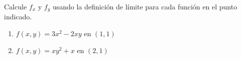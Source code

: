 Calcule $f_x$ y $f_y$ usando la definición de límite para cada función en el punto indicado.
\begin{enumerate}
    \item $f(x, y) = 3x^2 - 2xy$ en $(1, 1)$
    \item $f(x, y) = xy^2 + x$ en $(2, 1)$
\end{enumerate}
